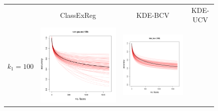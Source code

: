 \documentclass[twoside,11pt]{article}
\newenvironment{myfont}{\fontfamily{phv}\selectfont}{\par}
\begin{document}
\begin{figure}[t]
\centering
\begin{tabular}{cccc}
&
\begin{myfont}ClassExReg\end{myfont} & 
\begin{myfont}KDE-BCV\end{myfont} &
\begin{myfont}KDE-UCV\end{myfont}\\
\begin{myfont}$k_1 = 100$\end{myfont} & 
\includegraphics[scale = 0.2, clip = true, trim = 0 0 0 0.6in, valign=c]{repeat_100_r_cv_gauss.png} &
\includegraphics[scale = 0.2, clip = true, trim = 0 0 0 0.6in, valign=c]{repeat_100_kde_bcv.png} &

\end{tabular}
\end{figure}
\end{document}
